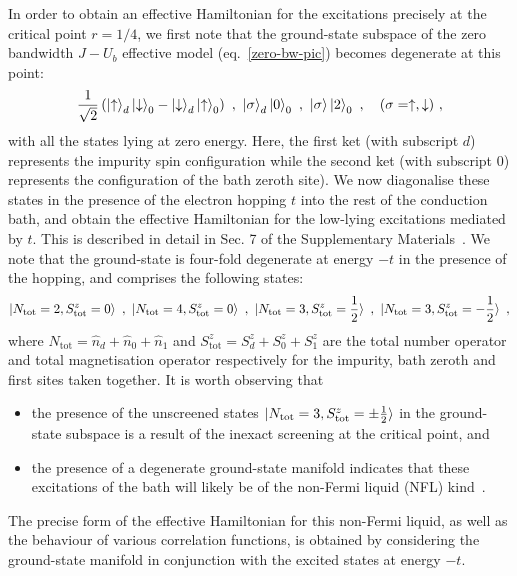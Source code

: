\documentclass{iopart}
\begin{document}
In order to obtain an effective Hamiltonian for the excitations precisely at the critical point \(r=1/4\), we first note that the ground-state subspace of the zero bandwidth $J-U_{b}$ effective model (eq.~\eqref{zero-bw-pic}) becomes degenerate at this point:
\begin{eqnarray}
\frac{1}{\sqrt 2}\left(\ket{\uparrow}_d\ket{\downarrow}_0 - \ket{\downarrow}_d\ket{\uparrow}_0\right)~,~ \ket{\sigma}_d\ket{0}_0~,~\ket{\sigma}\ket{2}_0~,~~~ (\sigma=\uparrow,\downarrow)~,
\end{eqnarray}
with all the states lying at zero energy. Here, the first ket (with subscript \(d\)) represents the impurity spin configuration while the second ket (with subscript \(0\)) represents the configuration of the bath zeroth site). We now diagonalise these states in the presence of the electron hopping \(t\) into the rest of the conduction bath, and obtain the effective Hamiltonian for the low-lying excitations mediated by \(t\). This is described in detail in Sec. 7 of the Supplementary Materials~\cite{supp_mat}. We note that the ground-state is four-fold degenerate at energy \(-t\) in the presence of the hopping, and comprises the following states:
\begin{eqnarray}
	\label{degenerate-nfl}
	\ket{N_\text{tot}=2,S^z_\text{tot}=0}~,~\ket{N_\text{tot}=4,S^z_\text{tot}=0}~, ~\ket{N_\text{tot}=3,S^z_\text{tot}=\frac{1}{2}}~,~\ket{N_\text{tot}=3,S^z_\text{tot}=-\frac{1}{2}}~,
\end{eqnarray}
where \(N_\text{tot} = \hat n_d + \hat n_0 + \hat n_1\) and \(S^z_\text{tot} = S^z_d + S^z_0 + S^z_1\) are the total number operator and total magnetisation operator respectively for the impurity, bath zeroth and first sites taken together. It is worth observing that
\begin{itemize}
	\item the presence of the unscreened states \(\ket{N_\text{tot}=3,S^z_\text{tot}=\pm\frac{1}{2}}\) in the ground-state subspace is a result of the inexact screening at the critical point, and
	\item the presence of a degenerate ground-state manifold indicates that these excitations of the bath will likely be of the non-Fermi liquid (NFL) kind~\cite{varma2002singular,si_kotliar_1993,Kotliar_1993}.
\end{itemize}
The precise form of the effective Hamiltonian for this non-Fermi liquid, as well as the behaviour of various correlation functions, is obtained by considering the ground-state manifold in conjunction with the excited states at energy \(-t\). 
\end{document}
